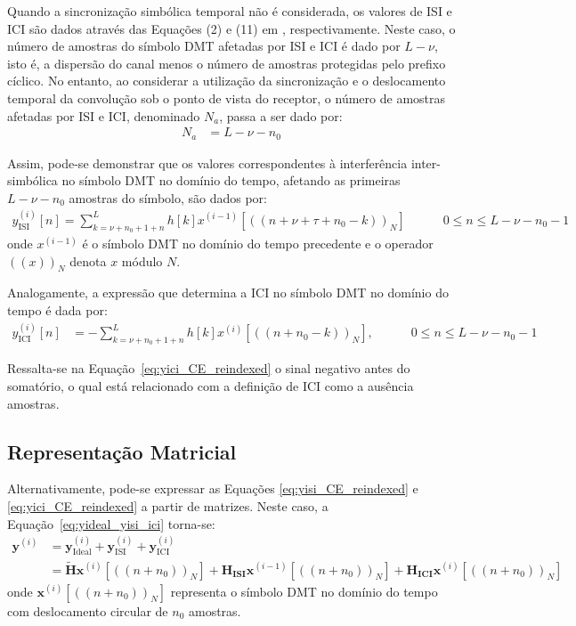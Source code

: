 Quando a sincronização simbólica temporal não é considerada, os valores de ISI e ICI são dados através das Equações (2) e (11) em \cite{perodling2002}, respectivamente. Neste caso, o número de amostras do símbolo DMT afetadas por ISI e ICI é dado por $L - \nu$, isto é, a dispersão do canal menos o número de amostras protegidas pelo prefixo cíclico. No entanto, ao considerar a utilização da sincronização e o deslocamento temporal da convolução sob o ponto de vista do receptor, o número de amostras afetadas por ISI e ICI, denominado $N_a$, passa a ser dado por:
\begin{align}
N_a&= L - \nu - n_0
\label{eq:yisi_affected_CE}
\end{align}

Assim, pode-se demonstrar que os valores correspondentes à interferência inter-simbólica no símbolo DMT no domínio do tempo, afetando as primeiras $L - \nu - n_0$ amostras do símbolo, são dados por:	
\begin{align}
y_{ \text{ISI} }^{(i)}[n]  =  \sum \limits_{k = \nu + n_0 + 1 + n }^{ L }      h[k]  x^{(i-1)}[ (( n + \nu + \tau + n_0 -k))_N] \label{eq:yisi_CE_reindexed} \quad \quad \quad 0 \leq n \leq L - \nu - n_0 - 1 
\end{align}
onde $x^{(i-1)}$ é o símbolo DMT no domínio do tempo precedente e o operador $((x))_N$ denota $x$ módulo $N$.

Analogamente, a expressão que determina a ICI no símbolo DMT no domínio do tempo é dada por:
\begin{align}
y_{ \text{ICI} }^{(i)}[n]  &=  -\sum \limits_{k = \nu + n_0 + 1 + n }^{ L }      h[k] x^{(i)}[ ((n +n_0 -k))_N ], \label{eq:yici_CE_reindexed} \quad \quad \quad 0 \leq n \leq L - \nu - n_0 - 1
\end{align}

Ressalta-se na Equação~\ref{eq:yici_CE_reindexed} o sinal negativo antes do somatório, o qual está relacionado com a definição de ICI como a ausência amostras.

\subsection{Representação Matricial}

Alternativamente, pode-se expressar as Equações \ref{eq:yisi_CE_reindexed} e  \ref{eq:yici_CE_reindexed} a partir de matrizes. Neste caso, a Equação~\ref{eq:yideal_yisi_ici} torna-se:
\begin{align}
\mathbf{y}^{(i)} &= \mathbf{y}_\text{Ideal}^{(i)} + \mathbf{y}_\text{ISI}^{(i)} + \mathbf{y}_\text{ICI}^{(i)} \nonumber\\
&= \mathbf{\tilde{H}} \mathbf{x}^{(i)}[ ((n + n_0))_N]  + \mathbf{ H_\text{ISI}} \mathbf{x}^{(i-1)}[ ((n + n_0))_N]  + \mathbf{H_\text{ICI}} \mathbf{x}^{(i)}[ ((n + n_0))_N] 
\nonumber
\end{align}
onde $\mathbf{x}^{(i)}[((n + n_0))_N] $ representa o símbolo DMT no domínio do tempo com deslocamento circular de $n_0$ amostras.

